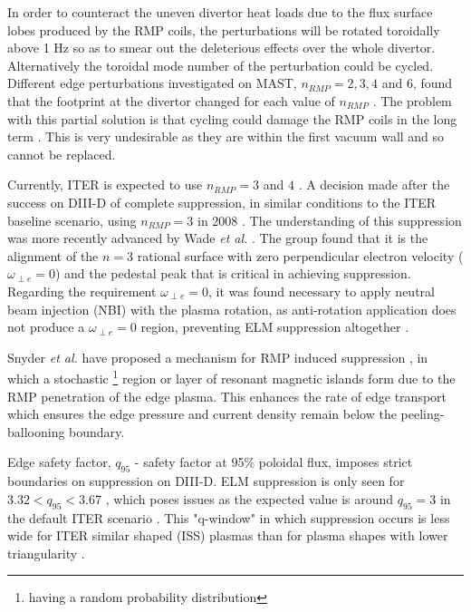 \documentclass[11pt, twocolumn]{article}  %
\begin{document}
In order to counteract the uneven divertor heat loads due to the flux surface lobes produced by the RMP coils, the perturbations will be rotated toroidally above 1 Hz \cite{LoarteTR2013} so as to smear out the deleterious effects over the whole divertor. Alternatively the toroidal mode number of the perturbation could be cycled. Different edge perturbations investigated on MAST, $n_{RMP}=2,3,4$ and $6$, found that the footprint at the divertor changed for each value of $n_{RMP}$ \cite{Chapman2014}. The problem with this partial solution is that cycling could damage the RMP coils in the long term \cite{KirkFF}. This is very undesirable as they are within the first vacuum wall and so cannot be replaced. 

Currently, ITER is expected to use $n_{RMP} = 3$ and $4$ \cite{Chapman2014}. A decision made after the success on DIII-D of complete suppression, in similar conditions to the ITER baseline scenario, using $n_{RMP}=3$ in 2008 \cite{Evans2008, Fenstermacher2008}. The understanding of this suppression was more recently advanced by Wade \textit{et al.} \cite{Wade2015}. The group found that it is the alignment of the $n=3$ rational surface with zero perpendicular electron velocity ($\omega_{\perp e} = 0$) and the pedestal peak that is critical in achieving suppression. Regarding the requirement $\omega_{\perp e} =0$, it was found necessary to apply neutral beam injection (NBI) with the plasma rotation, as anti-rotation application does not produce a $\omega_{\perp e} = 0$ region, preventing ELM suppression altogether \cite{Wade2015}.

Snyder \textit{et al.} have proposed a mechanism for RMP induced suppression \cite{Snyder2012}, in which a stochastic \footnote{having a random probability distribution} region or layer of resonant magnetic islands form due to the RMP penetration of the edge plasma. This enhances the rate of edge transport which ensures the edge pressure and current density remain below the peeling-ballooning boundary.

Edge safety factor, $q_{95}$ - safety factor at 95\% poloidal flux, imposes strict boundaries on suppression on DIII-D. ELM suppression is only seen for $3.32 < q_{95} < 3.67$ \cite{Fenstermacher2008}, which poses issues as the expected value is around $q_{95} = 3$ in the default ITER scenario \cite{Gormezano2007}. This "q-window" in which suppression occurs is less wide for ITER similar shaped (ISS) plasmas than for plasma shapes with lower triangularity \cite{Evans2008}. 
\end{document}
